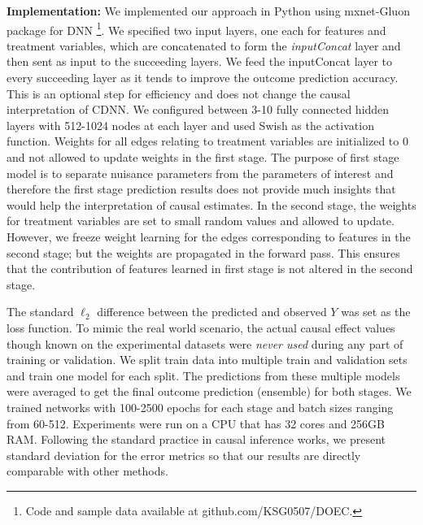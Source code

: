 \documentclass[sigconf]{acmart}
\newcommand{\eat}[1]{}
\theoremstyle{plain}
\numberwithin{equation}{section}
\begin{document}
\textbf{Implementation:} We implemented our approach in Python using mxnet-Gluon \cite{gluon} package for DNN
\footnote{Code and sample data available at github.com/KSG0507/DOEC.\eat{Every effort is taken to ensure that author names and affiliations are kept anonymous in the github link}}. 
We specified two input layers, one each for features and treatment variables, which are concatenated to form the \emph{inputConcat} layer and then sent as input to the succeeding layers. We feed the inputConcat layer to every succeeding layer as it tends to improve the outcome prediction accuracy. This is an optional step for efficiency and does not change the causal interpretation of CDNN. We configured between 3-10 fully connected hidden layers with 512-1024 nodes at each layer and used Swish as the activation function. Weights for all edges relating to treatment variables are initialized to 0 and not allowed to update weights in the first stage. The purpose of first stage model is to separate nuisance parameters from the parameters of interest and therefore the first stage prediction results does not provide much insights that would help the interpretation of causal estimates. In the second stage, the weights for treatment variables are set to small random values and allowed to update. However, we freeze weight learning for the edges corresponding to features in the second stage; but the weights are propagated in the forward pass. This ensures that the contribution of features learned in first stage is not altered in the second stage.\eat{the activation function applied on each node in the inputConcat layer helps to prevent any succeeding layer from identifying how the output from inputConcat layer nodes are computed.} 

The standard $\ell_2$ difference between the predicted and observed $Y$ was set as the loss function. To mimic the real world scenario, the actual causal effect values though known on the experimental datasets were \emph{never used} during any part of training or validation. We split train data into multiple train and validation sets and train one model for each split. The predictions from these multiple models were averaged to get the final outcome prediction (ensemble) for both stages. We trained networks with 100-2500 epochs for each stage and batch sizes ranging from 60-512. Experiments were run on a CPU that has 32 cores and 256GB RAM. Following the standard practice in causal inference works, we present standard deviation for the error metrics so that our results are directly comparable with other methods.
\end{document}
